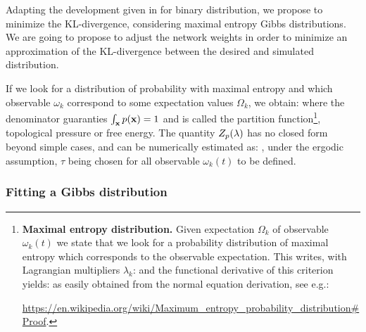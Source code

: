 Adapting the development given in \cite{vasquez:inria-00574954} for binary distribution, we propose to minimize the KL-divergence, considering maximal entropy Gibbs distributions. We are going to propose to adjust the network weights in order to minimize an approximation of the KL-divergence between the desired and simulated distribution.

If we look for a distribution of probability with maximal entropy and which observable $\omega_{k}$ correspond to some expectation values ${\Omega}_{k}$, we obtain:
where the denominator guaranties $\int_{{\bf x}} p({\bf x}) = 1$ and is called the partition function\footnote{{\bf Maximal entropy distribution.} Given expectation  ${\Omega}_{k}$  of observable $\omega_{k}(t)$ we state that we look for a probability distribution of maximal entropy which corresponds to the observable expectation. This writes, with Lagrangian multipliers $\lambda_k$:
and the functional derivative of this criterion yields:
as easily obtained from the normal equation derivation, see e.g.:
\\ \centerline{\href{https://en.wikipedia.org/wiki/Maximum\_entropy\_probability\_distribution\#Proof}{https://en.wikipedia.org/wiki/Maximum\_entropy\_probability\_distribution\#Proof}.}\hr}, topological pressure or free energy. The quantity $Z_p({\bf \lambda})$ has no closed form beyond simple cases, and can be numerically estimated as:
, under the ergodic assumption, $\tau$ being chosen for all observable ${\omega}_{k}(t)$ to be defined.

\subsubsection*{Fitting a Gibbs distribution}

